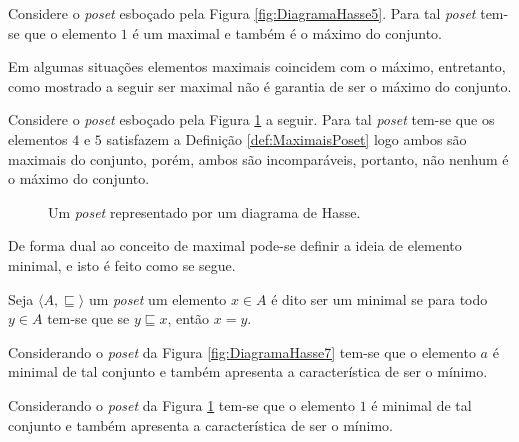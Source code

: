 \begin{example}
	Considere o \textit{poset} esboçado pela Figura \ref{fig:DiagramaHasse5}. Para tal \textit{poset} tem-se que o elemento $1$ é um maximal e também é o máximo do conjunto.
\end{example}

Em algumas situações elementos maximais coincidem com o máximo, entretanto, como mostrado a seguir ser maximal não é garantia de ser o máximo do conjunto.

\begin{example}
	Considere o \textit{poset} esboçado pela Figura \ref{fig:DiagramaHasse8} a seguir. Para tal \textit{poset} tem-se que os elementos $4$ e $5$ satisfazem a Definição \ref{def:MaximaisPoset} logo ambos são maximais do conjunto, porém, ambos são incomparáveis, portanto, não nenhum é o máximo do conjunto.
	
	
	\begin{figure}[h]
		\centering
		\caption{Um \textit{poset} representado por um diagrama de Hasse.}
		\label{fig:DiagramaHasse8}
	\end{figure}
\end{example} 

De forma dual ao conceito de maximal pode-se definir a ideia de elemento minimal, e isto é feito como se segue.

\begin{definition}\label{def:MinimalPoset}
	Seja $\langle A, \sqsubseteq \rangle$ um \textit{poset}  um elemento $x \in A$ é dito ser um minimal se para todo $y \in A$ tem-se que se $y\sqsubseteq x$, então $x = y$.
\end{definition}

\begin{example}
	Considerando o \textit{poset} da Figura \ref{fig:DiagramaHasse7} tem-se que o elemento $a$ é minimal de tal conjunto e também apresenta a característica de ser o mínimo.
\end{example}

\begin{example}
	Considerando o \textit{poset} da Figura \ref{fig:DiagramaHasse8} tem-se que o elemento $1$ é minimal de tal conjunto e também apresenta a característica de ser o mínimo.
\end{example}

